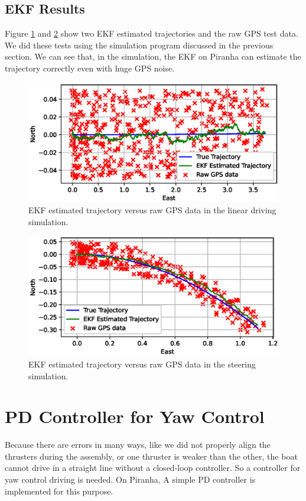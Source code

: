 \subsection{EKF Results}

Figure \ref{fig:05ekf-result-linear} and \ref{fig:05ekf-result-turn} show two EKF estimated trajectories and the raw GPS test data. We did these tests using the simulation program discussed in the previous section. We can see that, in the simulation, the EKF on Piranha can estimate the trajectory correctly even with huge GPS noise.

\begin{figure}[H]
    \centering
    \includegraphics[width=.8\textwidth]{images/05ekf-result-linear.eps}
    \caption{EKF estimated trajectory versus raw GPS data in the linear driving simulation.}
    \label{fig:05ekf-result-linear}
\end{figure}

\begin{figure}[H]
    \centering
    \includegraphics[width=.8\textwidth]{images/05ekf-result-turn.eps}
    \caption{EKF estimated trajectory versus raw GPS data in the steering simulation.}
    \label{fig:05ekf-result-turn}
\end{figure}

\section{PD Controller for Yaw Control}

Because there are errors in many ways, like we did not properly align the thrusters during the assembly, or one thruster is weaker than the other, the boat cannot drive in a straight line without a closed-loop controller. So a controller for yaw control driving is needed. On Piranha, A simple PD controller is implemented for this purpose. 


